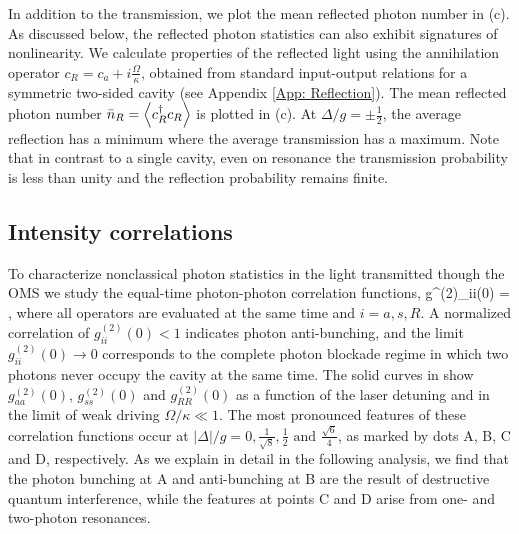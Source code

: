 In addition to the transmission,
we plot the mean reflected photon number
in  (c).
As discussed below, the reflected 
photon statistics
can also exhibit signatures of
nonlinearity.
We  calculate properties of the reflected light
using the
annihilation operator 
$c_R = c_a + i\frac{\Omega}{\kappa}$, obtained from standard input-output relations
for a symmetric two-sided cavity (see Appendix
\ref{App: Reflection}).
The mean reflected photon number
$\bar n_R = \left< c_R^\dagger c_R \right>$
is plotted in (c).
At $\Delta/g = \pm \frac{1}{2}$, 
the average reflection has a minimum where the
average transmission has a maximum. 
Note that in contrast to a single cavity, 
even on resonance the transmission probability
is less than unity and the reflection probability
remains finite.



\subsection{Intensity correlations}
\label{sec:onetime_correlation}

To  characterize nonclassical 
photon statistics in the light transmitted though the OMS
we study the equal-time photon-photon correlation
functions,
\bel
	\label{eq:g2(0)}
	g^{(2)}_{ii}(0)
	=  ,
\eel
where all operators are evaluated at the same time and $i = a,s, R$. 
A normalized correlation of
$g^{(2)}_{ii}(0)< 1$ indicates photon anti-bunching, and the limit
$g^{(2)}_{ii}(0)\rightarrow 0$ corresponds to the 
complete photon blockade regime
in which two photons never occupy the cavity
at the same time.
The solid curves in  show $g^{(2)}_{aa}(0)$,
$g^{(2)}_{ss}(0)$ and $g^{(2)}_{RR}(0)$ as a function of the laser  detuning and
in the limit of weak driving $\Omega/\kappa \ll1 $.
The most pronounced features of these correlation functions occur at 
$|\Delta|/g = 0, \frac{1}{\sqrt{8}}, \frac{1}{2} \text{ and }\frac{\sqrt{6}}{4}$, 
as marked by
dots A, B, C and D, respectively. 
As we explain in detail in the following analysis, 
we find that the photon bunching at A and
anti-bunching at B are the result of destructive 
quantum interference, while the 
features at points C and D arise from 
one- and two-photon resonances. 


